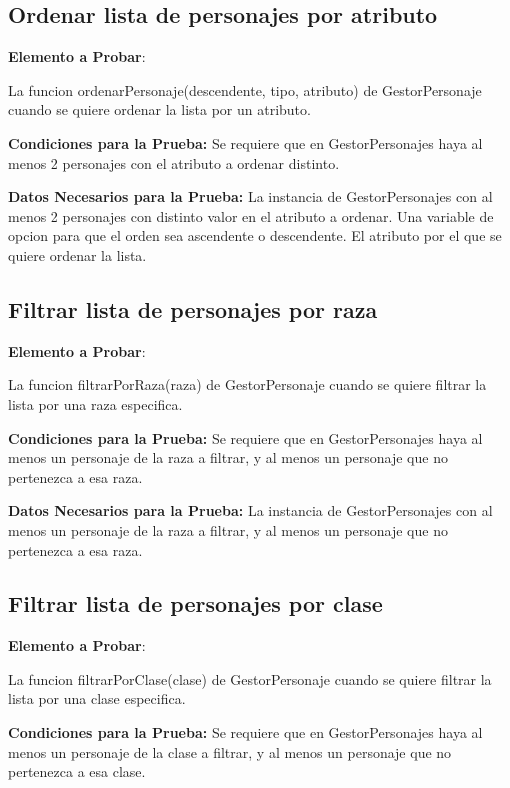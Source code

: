 \documentclass{article}
\begin{document}
\subsection{Ordenar lista de personajes por atributo}

    \textbf{ Elemento a Probar}: 
    
    La funcion ordenarPersonaje(descendente, tipo, atributo) de GestorPersonaje cuando se quiere ordenar la lista por un atributo.
    
        \textbf{Condiciones para la Prueba:}
            Se requiere que en GestorPersonajes haya al menos 2 personajes con el atributo a ordenar distinto.
    
        \textbf{Datos Necesarios para la Prueba:}
            La instancia de GestorPersonajes con al menos 2 personajes con distinto valor en el atributo a ordenar.
            Una variable de opcion para que el orden sea ascendente o descendente.
            El atributo por el que se quiere ordenar la lista.

\subsection{Filtrar lista de personajes por raza}

    \textbf{ Elemento a Probar}: 
    
    La funcion filtrarPorRaza(raza) de GestorPersonaje cuando se quiere filtrar la lista por una raza especifica.
    
        \textbf{Condiciones para la Prueba:}
            Se requiere que en GestorPersonajes haya al menos un personaje de la raza a filtrar, y al menos un personaje que no pertenezca a esa raza.
    
        \textbf{Datos Necesarios para la Prueba:}
            La instancia de GestorPersonajes con al menos un personaje de la raza a filtrar, y al menos un personaje que no pertenezca a esa raza.

\subsection{Filtrar lista de personajes por clase}

    \textbf{ Elemento a Probar}: 
    
    La funcion filtrarPorClase(clase) de GestorPersonaje cuando se quiere filtrar la lista por una clase especifica.
    
        \textbf{Condiciones para la Prueba:}
            Se requiere que en GestorPersonajes haya al menos un personaje de la clase a filtrar, y al menos un personaje que no pertenezca a esa clase.
    
\end{document}
